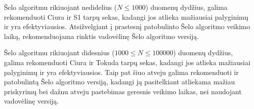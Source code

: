 \documentclass{VUMIFInfKursinis}
\begin{document}
Šelo algoritmu rikiuojant nedidelius ($N \leq 1000$) duomenų dydžius,
galima rekomenduoti Ciura ir S1 tarpų sekas, kadangi jos atlieka mažiausiai palyginimų ir yra efektyviausios.
Atsižvelgiant į prastesnį patobulinto Šelo algoritmo veikimo laiką,
rekomenduojama rinktis vadovėlinę Šelo algoritmo versiją.

Šelo algoritmu rikiuojant didesnius ($1000 \leq N \leq 100000$) duomenų dydžius, galima rekomenduoti Ciura ir Tokuda tarpų sekas,
kadangi jos atlieka mažiausiai palyginimų ir yra efektyviausios.
Taip pat šiuo atveju galima rekomenduoti ir patobulintą Šelo algoritmo versiją,
kadangi ją pasitelkiant atliekama mažiau priskyrimų bei dažnu atveju pastebimas geresnis veikimo laikas, nei naudojant vadovėlinę versiją.




\printbibliography[heading=bibintoc] %

\end{document}

